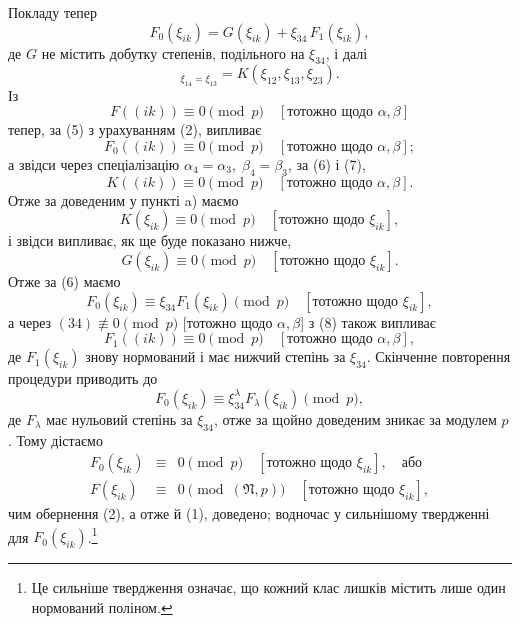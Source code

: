 \documentclass[11pt]{article}
\providecommand{\frN}{\mathfrak N}
\begin{document}
Покладу тепер
\begin{equation}
        F_0(\xi_{ik})=G(\xi_{ik})+\xi_{34}\,F_1(\xi_{ik}),
\end{equation}
де \(G\) не містить добутку степенів, подільного на \(\xi_{34}\), і далі
\begin{equation}
        [G]_{\xi_{14}=\xi_{13}}=K(\xi_{12},\xi_{13},\xi_{23}).
\end{equation}
Із
\[
        F((ik))\equiv0\pmod p\quad[\text{тотожно щодо \(\alpha,\beta\)}]
\]
тепер, за (5) з урахуванням (2), випливає
\begin{equation}
        F_0((ik))\equiv0\pmod p\quad [\text{тотожно щодо \(\alpha,\beta\)}];
\end{equation}
а звідси через спеціалізацію \(\alpha_4=\alpha_3,\;\beta_4=\beta_3\), за (6) і (7),
\[
        K((ik))\equiv0\pmod p\quad [\text{тотожно щодо \(\alpha,\beta\)}].
\]
Отже за доведеним у пункті a) маємо
\[
        K(\xi_{ik})\equiv0\pmod p\quad [\text{тотожно щодо \(\xi_{ik}\)}],
\]
і звідси випливає, як ще буде показано нижче,
\[
        G(\xi_{ik})\equiv0\pmod p\quad [\text{тотожно щодо \(\xi_{ik}\)}].
\]
Отже за (6) маємо
\[
        F_0(\xi_{ik})\equiv\xi_{34}F_1(\xi_{ik})\pmod p\quad [\text{тотожно щодо \(\xi_{ik}\)}],
\]
а через \((34)\not\equiv0\pmod p\) [тотожно щодо \(\alpha,\beta\)] з (8) також випливає
\[
        F_1((ik))\equiv0\pmod p\quad [\text{тотожно щодо \(\alpha,\beta\)}],
\]
де \(F_1(\xi_{ik})\) знову нормований і має нижчий степінь за \(\xi_{34}\). Скінченне повторення процедури приводить до
\[
        F_0(\xi_{ik})\equiv\xi_{34}^{\lambda}F_\lambda(\xi_{ik})\pmod p,
\]
де \(F_\lambda\) має нульовий степінь за \(\xi_{34}\), отже за щойно доведеним зникає за модулем \(p\). Тому дістаємо
\begin{equation}
\begin{array}{rcl}
        F_0(\xi_{ik})&\equiv&0\pmod p\quad [\text{тотожно щодо \(\xi_{ik}\)}],\quad\text{або}\\
        F(\xi_{ik})&\equiv&0\pmod{(\frN,p)}\quad [\text{тотожно щодо \(\xi_{ik}\)}],
\end{array}
\end{equation}
чим обернення (2), а отже й (1), доведено; водночас у сильнішому твердженні для \(F_0(\xi_{ik})\).\footnote{Це сильніше твердження означає, що кожний клас лишків містить лише один нормований поліном.}
\end{document}
